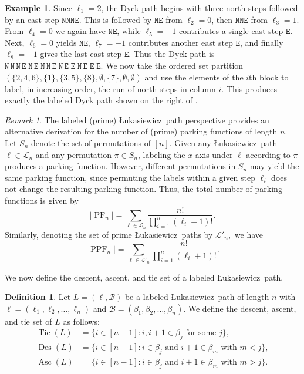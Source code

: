 \documentclass[12pt,reqno]{amsart}
\theoremstyle{definition}
\newtheorem{definition}{Definition}
\newtheorem{example}{Example}
\theoremstyle{remark}
\newtheorem{remark}{Remark}
\newcommand{\North}{\texttt{N}}
\newcommand{\East}{\texttt{E}}
\DeclareMathOperator{\PF}{PF}
\DeclareMathOperator{\PPF}{PPF}
\DeclareMathOperator{\Des}{Des}
\DeclareMathOperator{\Asc}{Asc}
\DeclareMathOperator{\Tie}{Tie}
\newcommand{\Luka}{\L ukasiewicz}
\newcommand{\LP}{\mathcal{L}}
\begin{document}
\begin{example}
Since $\ell_1 = 2$, the Dyck path begins with three north steps followed by an east step $\North\North\North\East$.  
This is followed by $\North\East$  from $\ell_2 = 0$,  
then $\North\North\East$ from $\ell_3 = 1$.  
From $\ell_4 = 0$ we again have $\North\East$,  
while $\ell_5 = -1$ contributes a single east step $\East$.  
Next, $\ell_6 = 0$ yields $\North\East$,  
$\ell_7 = -1$ contributes another east step $\East$,  
and finally $\ell_8 = -1$ gives the last east step $\East$. Thus the Dyck path is $\North\,\North\,\North\,\East\;
\North\,\East\;
\North\,\North\,\East\;
\North\,\East\;
\East\;
\North\,\East\;
\East\;
\East$.  We now take the ordered set partition $(\{2,4,6\},\{1\},\{3,5\},\{8\},\emptyset,\{7\},\emptyset,\emptyset)$  
and use the elements of the $i$th block to label, in increasing order, the run of north steps in column $i$.  
This produces exactly the labeled Dyck path shown on the right of .
\end{example}


\begin{remark}
The labeled (prime) \Luka~path perspective provides an alternative derivation for the number of (prime) parking functions of length $n$. Let $S_n$ denote the set of permutations of $[n]$. Given any \Luka~path $\ell \in \LP_n$ and any permutation $\pi \in S_n$, labeling the $x$-axis under $\ell$ according to $\pi$ produces a parking function.  
However, different permutations in $S_n$ may yield the same parking function, since permuting the labels within a given step $\ell_i$ does not change the resulting parking function.
 Thus, the total number of parking functions is given by $$|\PF_n|=\sum_{\ell\in\LP_n}\frac{n!}{\prod\limits_{i=1}^{n}(\ell_i+1)!} .$$
Similarly, denoting the set of prime \Luka~paths by $\LP'_n,$ we have
    $$|\PPF_n|=\sum_{\ell\in\LP'_n}\frac{n!}{\prod\limits_{i=1}^{n}(\ell_i+1)!}. $$
\end{remark}

We now define the descent, ascent, and tie set of a labeled \Luka~path. 


\begin{definition}\label{def:sets for Luka}
    Let $L=(\ell,\mathcal{B})$ be a labeled \Luka~path of length $n$  with 
    $\ell=(\ell_1,\ell_2,\ldots,\ell_n)$ and $\mathcal{B}=(\beta_1,\beta_2,\ldots,\beta_n)$.
    We define the descent, ascent, and tie set of $L$ as follows:
    \begin{align*}
        \Tie(L)&=\{i\in[n-1]:i,i+1\in\beta_j\mbox{ for some $j$}\},\\
        \Des(L)&=\{i\in[n-1]:\mbox{$i\in \beta_j$ and $i+1\in \beta_m$ with $m<j$}\},\\
        \Asc(L)&=\{i\in[n-1]:\mbox{$i\in \beta_j$ and $i+1\in \beta_m$ with $m>j$}\}.
    \end{align*}
\end{definition}
\end{document}
